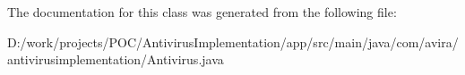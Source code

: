 The documentation for this class was generated from the following file\+:\begin{DoxyCompactItemize}
\item 
D\+:/work/projects/\+P\+O\+C/\+Antivirus\+Implementation/app/src/main/java/com/avira/antivirusimplementation/Antivirus.\+java\end{DoxyCompactItemize}

